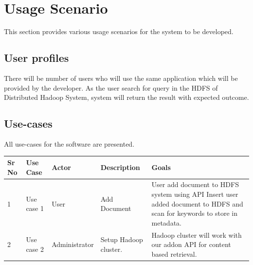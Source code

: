 \documentclass[oneside,a4paper,12pt]{report}
\begin{document}
\section{Usage Scenario}
This section provides various usage scenarios for the system to be developed.

\subsection{User profiles}
There will be number of users who will use the same application which will be provided by the developer. As the user search for query in the HDFS of Distributed Hadoop System, system will return the result with expected outcome. 

\subsection{Use-cases}
All use-cases for the software are presented.

{\tabulinesep=2mm
   \begin{longtabu} { |p{2.5cm} | p{2.5cm} | p{2.5cm }| p{2.5cm }| p{2.5cm }|}
       \hline

\textbf{Sr No} & \textbf{Use Case } & \textbf{Actor} & \textbf{Description} & \textbf{Goals} \\ \hline

1 & Use case 1 & User & Add Document & User add document to HDFS system using API  Insert user added document to HDFS and scan for keywords to store in metadata.
\\  & Use case 2 & Administrator & Setup Hadoop cluster. & Hadoop cluster will work with our addon API for content based retrieval. \\ \hline

   \end{longtabu}
}
\end{document}

